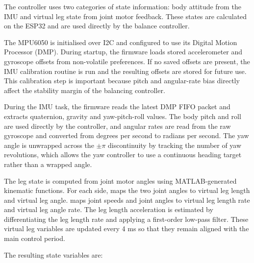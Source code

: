 \documentclass[12pt, a4paper]{article}
\begin{document}
The controller uses two categories of state information: body attitude from the IMU and virtual leg state from joint motor feedback. These states are calculated on the ESP32 and are used directly by the balance controller.

The MPU6050 is initialised over I2C and configured to use its Digital Motion Processor (DMP). During startup, the firmware loads stored accelerometer and gyroscope offsets from non-volatile preferences. If no saved offsets are present, the IMU calibration routine is run and the resulting offsets are stored for future use. This calibration step is important because pitch and angular-rate bias directly affect the stability margin of the balancing controller.

During the IMU task, the firmware reads the latest DMP FIFO packet and extracts quaternion, gravity and yaw-pitch-roll values. The body pitch and roll are used directly by the controller, and angular rates are read from the raw gyroscope and converted from degrees per second to radians per second. The yaw angle is unwrapped across the \( \pm \pi \) discontinuity by tracking the number of yaw revolutions, which allows the yaw controller to use a continuous heading target rather than a wrapped angle.

The leg state is computed from joint motor angles using MATLAB-generated kinematic functions. For each side, \texttt{} maps the two joint angles to virtual leg length and virtual leg angle. \texttt{} maps joint speeds and joint angles to virtual leg length rate and virtual leg angle rate. The leg length acceleration is estimated by differentiating the leg length rate and applying a first-order low-pass filter. These virtual leg variables are updated every 4 ms so that they remain aligned with the main control period.

The resulting state variables are:
\end{document}
